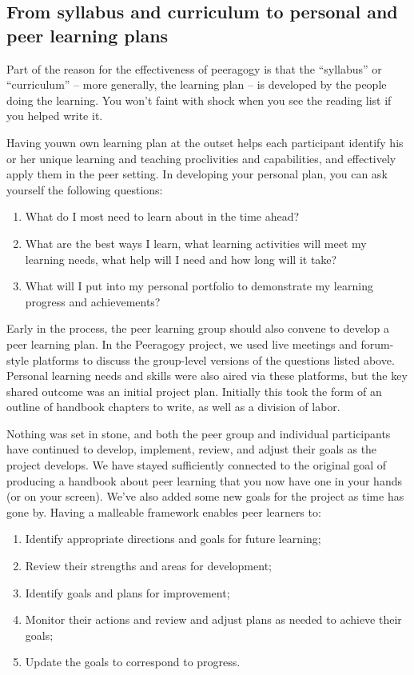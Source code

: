 \subsection{From syllabus and curriculum to personal and peer learning
plans}

Part of the reason for the effectiveness of peeragogy is that the
``syllabus'' or ``curriculum'' -- more generally, the learning plan --
is developed by the people doing the learning. You won't faint with
shock when you see the reading list if you helped write it.

Having youwn own learning plan at the outset helps each participant
identify his or her unique learning and teaching proclivities and
capabilities, and effectively apply them in the peer setting. In
developing your personal plan, you can ask yourself the following
questions:

\begin{enumerate}
\itemsep1pt\parskip0pt
\item
  What do I most need to learn about in the time ahead?
\item
  What are the best ways I learn, what learning activities will meet my
  learning needs, what help will I need and how long will it take?
\item
  What will I put into my personal portfolio to demonstrate my learning
  progress and achievements?
\end{enumerate}

Early in the process, the peer learning group should also convene to
develop a peer learning plan. In the Peeragogy project, we used live
meetings and forum-style platforms to discuss the group-level versions
of the questions listed above. Personal learning needs and skills were
also aired via these platforms, but the key shared outcome was an
initial project plan. Initially this took the form of an outline of
handbook chapters to write, as well as a division of labor.

Nothing was set in stone, and both the peer group and individual
participants have continued to develop, implement, review, and adjust
their goals as the project develops. We have stayed sufficiently
connected to the original goal of producing a handbook about peer
learning that you now have one in your hands (or on your screen). We've
also added some new goals for the project as time has gone by. Having a
malleable framework enables peer learners to:

\begin{enumerate}
\itemsep1pt\parskip0pt
\item
  Identify appropriate directions and goals for future learning;
\item
  Review their strengths and areas for development;
\item
  Identify goals and plans for improvement;
\item
  Monitor their actions and review and adjust plans as needed to achieve
  their goals;
\item
  Update the goals to correspond to progress.
\end{enumerate}

